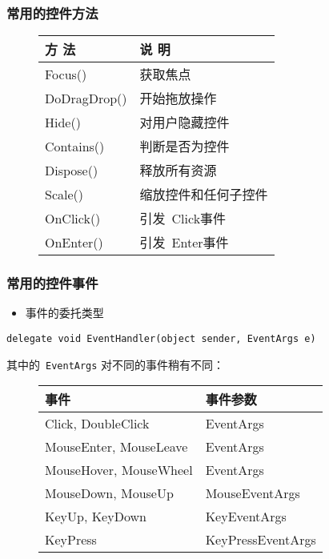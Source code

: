 \begin{frame}
\frametitle{常用的控件方法}
\begin{figure}
  \centering
  \begin{tabular}{l|l}
    \hline
    方 法        & 说 明                \\
    \hline
    Focus()      & 获取焦点             \\
    DoDragDrop() & 开始拖放操作         \\
    Hide()       & 对用户隐藏控件       \\
    \hline
    Contains()   & 判断是否为控件       \\
    Dispose()    & 释放所有资源         \\
    Scale()      & 缩放控件和任何子控件 \\
    \hline
    OnClick()    & 引发~Click事件       \\
    OnEnter()    & 引发~Enter事件       \\
    \hline
  \end{tabular}
\end{figure}
\end{frame}

\begin{frame}[fragile]
\frametitle{常用的控件事件}
\begin{itemize}
\item 事件的委托类型
\end{itemize}
\begin{lstlisting}
delegate void EventHandler(object sender, EventArgs e)
\end{lstlisting}
其中的~\texttt{EventArgs} 对不同的事件稍有不同：
\begin{figure}[htbp]
  \centering
  \begin{tabular}{l|l}
    \hline
    事件                   & 事件参数          \\
    \hline
    Click, DoubleClick     & EventArgs         \\
    MouseEnter, MouseLeave & EventArgs         \\
    MouseHover, MouseWheel & EventArgs         \\
    MouseDown, MouseUp     & MouseEventArgs    \\
    KeyUp, KeyDown         & KeyEventArgs      \\
    KeyPress               & KeyPressEventArgs \\
    \hline
  \end{tabular}
\end{figure}
\end{frame}

